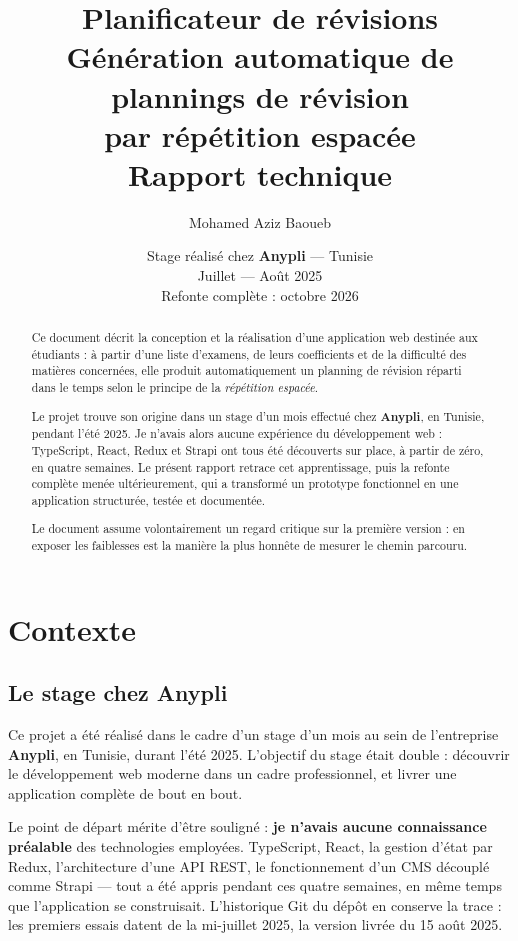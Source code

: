 \documentclass[11pt,a4paper]{report}
\title{%
  \vspace{-1.5cm}
  {\Huge\bfseries Planificateur de révisions}\\[0.4cm]
  {\Large Génération automatique de plannings de révision\\par répétition espacée}\\[1.2cm]
  {\large Rapport technique}
}
\author{Mohamed Aziz Baoueb}
\date{Stage réalisé chez \textbf{Anypli} --- Tunisie\\
Juillet --- Août 2025\\[0.6cm]
\small Refonte complète : octobre 2026}
\begin{document}
\maketitle
\thispagestyle{empty}

\begin{abstract}
\noindent
Ce document décrit la conception et la réalisation d'une application web destinée
aux étudiants : à partir d'une liste d'examens, de leurs coefficients et de la
difficulté des matières concernées, elle produit automatiquement un planning de
révision réparti dans le temps selon le principe de la \emph{répétition espacée}.

Le projet trouve son origine dans un stage d'un mois effectué chez \textbf{Anypli},
en Tunisie, pendant l'été 2025. Je n'avais alors aucune expérience du développement
web : TypeScript, React, Redux et Strapi ont tous été découverts sur place, à
partir de zéro, en quatre semaines. Le présent rapport retrace cet apprentissage,
puis la refonte complète menée ultérieurement, qui a transformé un prototype
fonctionnel en une application structurée, testée et documentée.

Le document assume volontairement un regard critique sur la première version :
en exposer les faiblesses est la manière la plus honnête de mesurer le chemin
parcouru.
\end{abstract}

\tableofcontents

\chapter{Contexte}

\section{Le stage chez Anypli}

Ce projet a été réalisé dans le cadre d'un stage d'un mois au sein de l'entreprise
\textbf{Anypli}, en Tunisie, durant l'été 2025. L'objectif du stage était double :
découvrir le développement web moderne dans un cadre professionnel, et livrer une
application complète de bout en bout.

Le point de départ mérite d'être souligné : \textbf{je n'avais aucune connaissance
préalable} des technologies employées. TypeScript, React, la gestion d'état par
Redux, l'architecture d'une API REST, le fonctionnement d'un CMS découplé comme
Strapi --- tout a été appris pendant ces quatre semaines, en même temps que
l'application se construisait. L'historique Git du dépôt en conserve la trace :
les premiers essais datent de la mi-juillet 2025, la version livrée du 15 août 2025.
\end{document}
